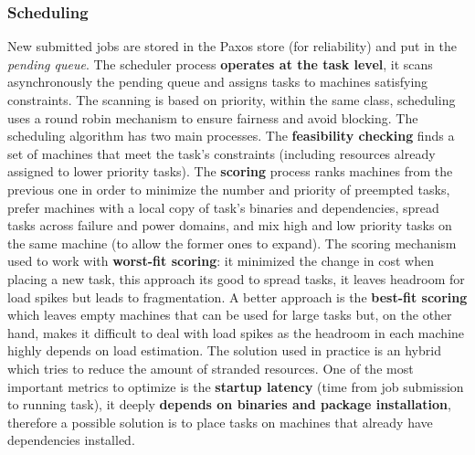 		\subsubsection{Scheduling}
		New submitted jobs are stored in the Paxos store (for reliability) and put in the \textit{pending queue}. The scheduler process \textbf{operates at the task level}, it scans asynchronously the pending queue and assigns tasks to machines satisfying constraints.\newline
		The scanning is based on priority, within the same class, scheduling uses a round robin mechanism to ensure fairness and avoid blocking.\newline
		\newline
		The scheduling algorithm has two main processes. The \textbf{feasibility checking} finds a set of machines that meet the task's constraints (including resources already assigned to lower priority tasks).\newline
		The \textbf{scoring} process ranks machines from the previous one in order to minimize the number and priority of preempted tasks, prefer machines with a local copy of task's binaries and dependencies, spread tasks across failure and power domains, and mix high and low priority tasks on the same machine (to allow the former ones to expand).\newline
		\newline
		The scoring mechanism used to work with \textbf{worst-fit scoring}: it minimized the change in cost when placing a new task, this approach its good to spread tasks, it leaves headroom for load spikes but leads to fragmentation.\newline
		A better approach is the \textbf{best-fit scoring} which leaves empty machines that can be used for large tasks but, on the other hand, makes it difficult to deal with load spikes as the headroom in each machine highly depends on load estimation.\newline
		The solution used in practice is an hybrid which tries to reduce the amount of stranded resources.\newline
		\newline
		One of the most important metrics to optimize is the \textbf{startup latency} (time from job submission to running task), it deeply \textbf{depends on binaries and package installation}, therefore a possible solution is to place tasks on machines that already have dependencies installed.
